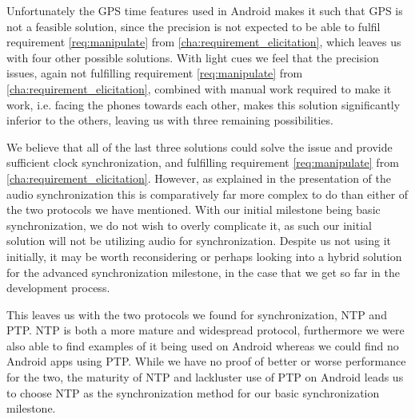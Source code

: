 Unfortunately the GPS time features used in Android makes it such that GPS is not a feasible solution, since the precision is not expected to be able to fulfil requirement \ref{req:manipulate} from \cref{cha:requirement_elicitation}, which leaves us with four other possible solutions.
With light cues we feel that the precision issues, again not fulfilling requirement \ref{req:manipulate} from \cref{cha:requirement_elicitation}, combined with manual work required to make it work, i.e. facing the phones towards each other, makes this solution significantly inferior to the others, leaving us with three remaining possibilities.

We believe that all of the last three solutions could solve the issue and provide sufficient clock synchronization, and fulfilling requirement \ref{req:manipulate} from \cref{cha:requirement_elicitation}.
However, as explained in the presentation of the audio synchronization this is comparatively far more complex to do than either of the two protocols we have mentioned.
With our initial milestone being basic synchronization, we do not wish to overly complicate it, as such our initial solution will not be utilizing audio for synchronization.
Despite us not using it initially, it may be worth reconsidering or perhaps looking into a hybrid solution for the advanced synchronization milestone, in the case that we get so far in the development process.

This leaves us with the two protocols we found for synchronization, \ac{NTP} and \ac{PTP}.
\ac{NTP} is both a more mature and widespread protocol, furthermore we were also able to find examples of it being used on Android whereas we could find no Android apps using \ac{PTP}.
While we have no proof of better or worse performance for the two, the maturity of \ac{NTP} and lackluster use of \ac{PTP} on Android leads us to choose \ac{NTP} as the synchronization method for our basic synchronization milestone.

